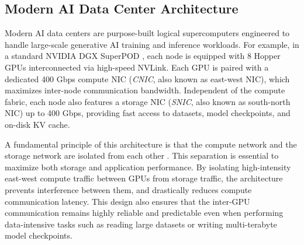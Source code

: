 \subsection{Modern AI Data Center Architecture}

Modern AI data centers are purpose-built logical supercomputers engineered to handle large-scale generative AI training and inference workloads. For example, in a standard NVIDIA DGX SuperPOD \cite{nvidia2023superpod}, each node is equipped with 8 Hopper GPUs interconnected via high-speed NVLink. Each GPU is paired with a dedicated 400 Gbps compute NIC (\emph{CNIC}, also known as east-west NIC), which maximizes inter-node communication bandwidth. Independent of the compute fabric, each node also features a storage NIC (\emph{SNIC}, also known as south-north NIC) up to 400 Gbps, providing fast access to datasets, model checkpoints, and on-disk KV cache.

A fundamental principle of this architecture is that the compute network and the storage network are isolated from each other \cite{zhao2025insights}. This separation is essential to maximize both storage and application performance. By isolating high-intensity east-west compute traffic between GPUs from storage traffic, the architecture prevents interference between them, and drastically reduces compute communication latency. This design also ensures that the inter-GPU communication remains highly reliable and predictable even when performing data-intensive tasks such as reading large datasets or writing multi-terabyte model checkpoints.